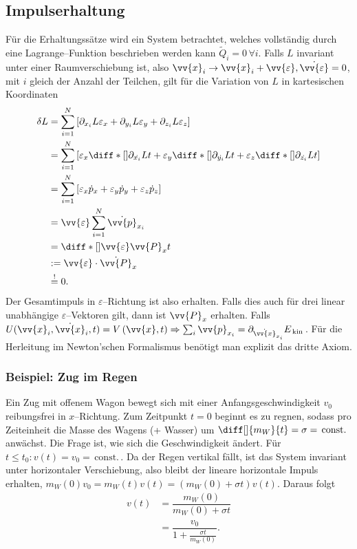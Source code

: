 \documentclass[a4paper,12pt]{article}
\numberwithin{equation}{section}
\begin{document}
\subsection{Impulserhaltung}
Für die Erhaltungssätze wird ein System betrachtet, welches vollständig durch eine Lagrange--Funktion beschrieben werden kann $\tilde Q_i=0\,\forall i$. Falls $L$ invariant unter einer Raumverschiebung ist, also $\vv{x}_i\rightarrow \vv{x}_i+\vv{\varepsilon },\dot{\vv{\varepsilon }}=0$, mit $i$ gleich der Anzahl der Teilchen, gilt für die Variation von $L$ in kartesischen Koordinaten
\begin{align*}
        \delta L&=\sum_{i=1}^{N}\left[\partial _{x_i}L\varepsilon _x+\partial _{y_i}L\varepsilon _y+\partial _{z_i}L\varepsilon _z\right]\\
                &=\sum_{i=1}^{N}\left[\varepsilon _x\diff*[]{\partial _{\dot{x_i}}L}{t}+\varepsilon _y\diff*[]{\partial _{\dot{y_i}}L}{t}+\varepsilon _z\diff*[]{\partial _{\dot{z_i}}L}{t}\right]\\
                &=\sum_{i=1}^{N}\left[\varepsilon _x\dot{p}_x+\varepsilon _y\dot{p}_y+\varepsilon _z\dot{p}_z\right]\\
                &=\vv{\varepsilon }\sum_{i=1}^{N}\dot{\vv{p}}_{x_i}\\
                &=\diff*[]{\vv{\varepsilon }\vv{P}_x}{t}\\
                &:=\vv{\varepsilon }\cdot \dot{\vv{P}}_x\\
                &\stackrel{!}{=}0
.\end{align*} 
Der Gesamtimpuls in $\varepsilon $--Richtung ist also erhalten. Falls dies auch für drei linear unabhängige $\varepsilon $--Vektoren gilt, dann ist $\vv{P}_x$ erhalten. Falls $U(\vv{x}_i,\dot{\vv{x}}_i,t)=V\left(\vv{x},t\right)\Rightarrow \sum_{i}^{}\vv{p}_{x_i}=\partial _{\dot{\vv{x}}_{x_i}}E_{\,\text{kin}\,}$. Für die Herleitung im Newton'schen Formalismus benötigt man explizit das dritte Axiom.
\subsubsection{Beispiel: Zug im Regen}
Ein Zug mit offenem Wagon bewegt sich mit einer Anfangsgeschwindigkeit $v_0$ reibungsfrei in $x$--Richtung. Zum Zeitpunkt $t=0$ beginnt es zu regnen, sodass pro Zeiteinheit die Masse des Wagens (+ Wasser) um $\diff[]{m_W}{t}=\sigma =\,\text{const.}\,$ anwächst. Die Frage ist, wie sich die Geschwindigkeit ändert. Für $t\leq t_0:v(t)=v_0=\,\text{const.}\,$. Da der Regen vertikal fällt, ist das System invariant unter horizontaler Verschiebung, also bleibt der lineare horizontale Impuls erhalten, $m_W(0)v_0=m_W(t)v(t)=\left(m_W(0)+\sigma t\right)v(t)$. Daraus folgt
\begin{align*}
        v(t)&=\dfrac{m_W(0)}{m_W(0)+\sigma t}\\
            &=\dfrac{v_0}{1+\tfrac{\sigma t}{m_W(0)}}
.\end{align*}
\end{document}
